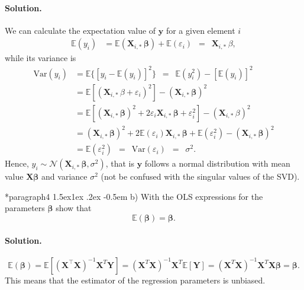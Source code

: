 \documentclass[%
oneside,                 %
final,                   %
10pt]{article}
\makeatletter
\newenvironment{doconceexercise}{}{}
\newcommand\subex{\@startsection*{paragraph}{4}{\z@}%
                  {1.5ex\@plus1ex \@minus.2ex}%
                  {-0.5em}%
                  {\normalfont\normalsize\bfseries}}
\makeatother
\begin{document}
\begin{doconceexercise}
\paragraph{Solution.}
We can calculate the expectation value of $\bm{y}$ for a given element $i$ 
\begin{align*} 
\mathbb{E}(y_i) & =
\mathbb{E}(\mathbf{X}_{i, \ast} \, \bm{\beta}) + \mathbb{E}(\varepsilon_i)
\, \, \, = \, \, \, \mathbf{X}_{i, \ast} \, \beta, 
\end{align*} 
while
its variance is 
\begin{align*} \mbox{Var}(y_i) & = \mathbb{E} \{ [y_i
- \mathbb{E}(y_i)]^2 \} \, \, \, = \, \, \, \mathbb{E} ( y_i^2 ) -
[\mathbb{E}(y_i)]^2  \\  & = \mathbb{E} [ ( \mathbf{X}_{i, \ast} \,
\beta + \varepsilon_i )^2] - ( \mathbf{X}_{i, \ast} \, \bm{\beta})^2 \\ &
= \mathbb{E} [ ( \mathbf{X}_{i, \ast} \, \bm{\beta})^2 + 2 \varepsilon_i
\mathbf{X}_{i, \ast} \, \bm{\beta} + \varepsilon_i^2 ] - ( \mathbf{X}_{i,
\ast} \, \beta)^2 \\  & = ( \mathbf{X}_{i, \ast} \, \bm{\beta})^2 + 2
\mathbb{E}(\varepsilon_i) \mathbf{X}_{i, \ast} \, \bm{\beta} +
\mathbb{E}(\varepsilon_i^2 ) - ( \mathbf{X}_{i, \ast} \, \bm{\beta})^2 
\\ & = \mathbb{E}(\varepsilon_i^2 ) \, \, \, = \, \, \,
\mbox{Var}(\varepsilon_i) \, \, \, = \, \, \, \sigma^2.  
\end{align*}
Hence, $y_i \sim \mathcal{N}( \mathbf{X}_{i, \ast} \, \bm{\beta}, \sigma^2)$, that is $\bm{y}$ follows a normal distribution with 
mean value $\bm{X}\bm{\beta}$ and variance $\sigma^2$ (not be confused with the singular values of the SVD).


\subex{b)}
With the OLS expressions for the parameters $\bm{\beta}$ show that
\[
\mathbb{E}(\bm{\beta}) = \bm{\beta}.
\]


\paragraph{Solution.}
\[
\mathbb{E}(\bm{\beta}) = \mathbb{E}[ (\mathbf{X}^{\top} \mathbf{X})^{-1}\mathbf{X}^{T} \mathbf{Y}]=(\mathbf{X}^{T} \mathbf{X})^{-1}\mathbf{X}^{T} \mathbb{E}[ \mathbf{Y}]=(\mathbf{X}^{T} \mathbf{X})^{-1} \mathbf{X}^{T}\mathbf{X}\bm{\beta}=\bm{\beta}.
\]
This means that the estimator of the regression parameters is unbiased.


\end{doconceexercise}
\end{document}
